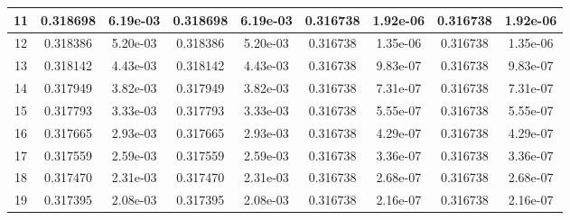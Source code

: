 \documentclass{report}[10pts]
\begin{document}
\begin{center}
\begin{tabular}{|c|c|c|c|c|c|c|c|c|}
   \hline
   11 & 0.318698 & 6.19e-03 & 0.318698 & 6.19e-03 & 0.316738 & 1.92e-06 & 0.316738 & 1.92e-06\\
   \hline
   12 & 0.318386 & 5.20e-03 & 0.318386 & 5.20e-03 & 0.316738 & 1.35e-06 & 0.316738 & 1.35e-06\\
   \hline
   13 & 0.318142 & 4.43e-03 & 0.318142 & 4.43e-03 & 0.316738 & 9.83e-07 & 0.316738 & 9.83e-07\\
   \hline
   14 & 0.317949 & 3.82e-03 & 0.317949 & 3.82e-03 & 0.316738 & 7.31e-07 & 0.316738 & 7.31e-07\\
   \hline
   15 & 0.317793 & 3.33e-03 & 0.317793 & 3.33e-03 & 0.316738 & 5.55e-07 & 0.316738 & 5.55e-07\\
   \hline
   16 & 0.317665 & 2.93e-03 & 0.317665 & 2.93e-03 & 0.316738 & 4.29e-07 & 0.316738 & 4.29e-07\\
   \hline
   17 & 0.317559 & 2.59e-03 & 0.317559 & 2.59e-03 & 0.316738 & 3.36e-07 & 0.316738 & 3.36e-07\\
   \hline
   18 & 0.317470 & 2.31e-03 & 0.317470 & 2.31e-03 & 0.316738 & 2.68e-07 & 0.316738 & 2.68e-07\\
   \hline
   19 & 0.317395 & 2.08e-03 & 0.317395 & 2.08e-03 & 0.316738 & 2.16e-07 & 0.316738 & 2.16e-07\\
   \hline
\end{tabular}\end{center}

\clearpage
\end{document}
